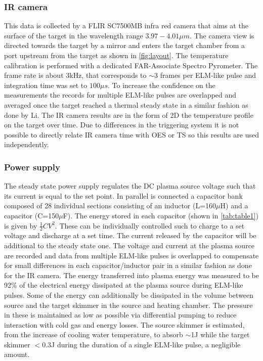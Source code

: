 \subsubsection{IR camera}\label{IR camera1}
This data is collected by a FLIR SC7500MB infra red camera that aims at the surface of the target in the wavelength range $3.97-4.01 \mu m$. The camera view is directed towards the target by a mirror and enters the target chamber from a port upstream from the target as shown in \autoref{fig:layout}. The temperature calibration is performed with a dedicated FAR-Associate Spectro Pyrometer. The frame rate is about 3kHz, that corresponds to $\sim$3 frames per ELM-like pulse and integration time was set to $100 \mu s$. To increase the confidence on the measurements the records for multiple ELM-like pulses are overlapped and averaged once the target reached a thermal steady state in a similar fashion as done by Li. \cite{Li2020} The IR camera results are in the form of 2D the temperature profile on the target over time. Due to differences in the triggering system it is not possible to directly relate IR camera time with OES or TS so this results are used independently.
\subsubsection{Power supply}\label{Power supply}
The steady state power supply regulates the DC plasma source voltage such that its current is equal to the set point. In parallel is connected a capacitor bank composed of 28 individual sections consisting of an inductor (L=160$\mu$H) and a capacitor (C=150$\mu$F). The energy stored in each capacitor (shown in \autoref{tab:table1}) is given by $\frac{1}{2}CV^2$. These can be individually controlled such to charge to a set voltage and discharge at a set time. The current released by the capacitor will be additional to the steady state one. The voltage and current at the plasma source are recorded and data from multiple ELM-like pulses is overlapped to compensate for small differences in each capacitor/inductor pair in a similar fashion as done for the IR camera. The energy transferred into plasma energy was measured to be 92\% of the electrical energy dissipated at the plasma source during ELM-like pulses.\cite{Morgan2014} Some of the energy can additionally be dissipated in the volume between source and the target skimmer in the source and heating chamber. The pressure in these is maintained as low as possible via differential pumping to reduce interaction with cold gas and energy losses. The source skimmer is estimated, from the increase of cooling water temperature, to absorb $\sim$1J while the target skimmer $<$0.3J during the duration of a single ELM-like pulse, a negligible amount.


